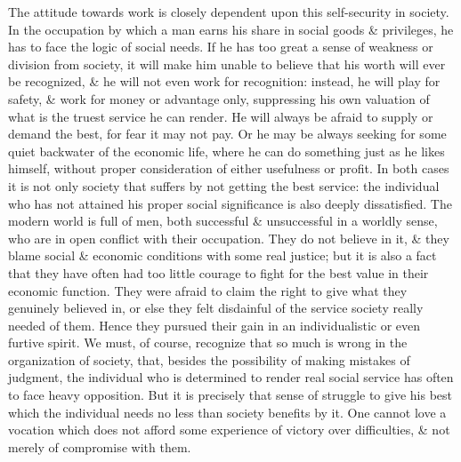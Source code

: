 \documentclass{article}
\begin{document}
The attitude towards work is closely dependent upon this self-security in society. In the occupation by which a man earns his share in social goods \& privileges, he has to face the logic of social needs. If he has too great a sense of weakness or division from society, it will make him unable to believe that his worth will ever be recognized, \& he will not even work for recognition: instead, he will play for safety, \& work for money or advantage only, suppressing his own valuation of what is the truest service he can render. He will always be afraid to supply or demand the best, for fear it may not pay. Or he may be always seeking for some quiet backwater of the economic life, where he can do something just as he likes himself, without proper consideration of either usefulness or profit. In both cases it is not only society that suffers by not getting the best service: the individual who has not attained his proper social significance is also deeply dissatisfied. The modern world is full of men, both successful \& unsuccessful in a worldly sense, who are in open conflict with their occupation. They do not believe in it, \& they blame social \& economic conditions with some real justice; but it is also a fact that they have often had too little courage to fight for the best value in their economic function. They were afraid to claim the right to give what they genuinely believed in, or else they felt disdainful of the service society really needed of them. Hence they pursued their gain in an individualistic or even furtive spirit. We must, of course, recognize that so much is wrong in the organization of society, that, besides the possibility of making mistakes of judgment, the individual who is determined to render real social service has often to face heavy opposition. But it is precisely that sense of struggle to give his best which the individual needs no less than society benefits by it. One cannot love a vocation which does not afford some experience of victory over difficulties, \& not merely of compromise with them.
\end{document}
